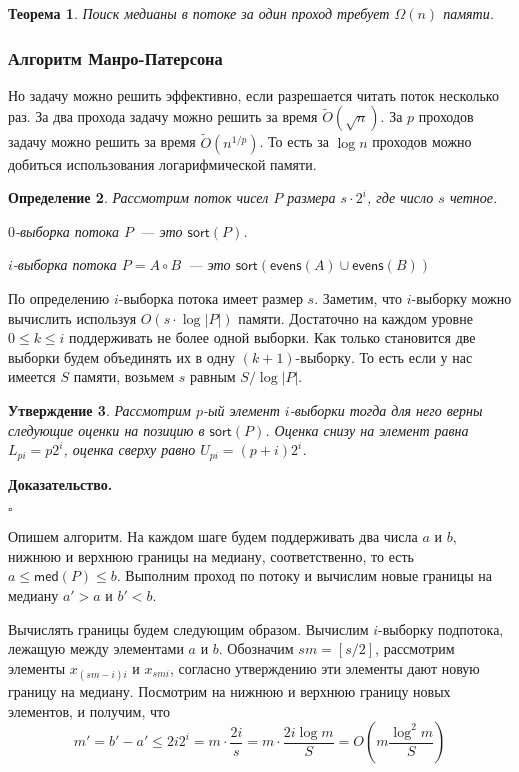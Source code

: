 \documentclass{article}
\newtheorem{theorem}{Теорема}
\newtheorem{definition}[theorem]{Определение}
\newtheorem{claim}[theorem]{Утверждение}
\newenvironment{proof}{\par\noindent%
{\bf Доказательство.\par\nopagebreak}}{\unskip\nobreak\enskip$\square$\par\bigskip}
\newcommand{\sort}{\mathsf{sort}}
\newcommand{\evens}{\mathsf{evens}}
\newcommand{\med}{\mathsf{med}}
\begin{document}
\begin{theorem}
    Поиск медианы в потоке за один проход требует $\Omega(n)$ памяти.
\end{theorem}

\subsubsection{Алгоритм Манро-Патерсона}

Но задачу можно решить эффективно, если разрешается читать поток несколько раз.
За два прохода задачу можно решить за время $\tilde{O}\left(\sqrt n\right)$.
За $p$ проходов задачу можно решить за время $\tilde{O}\left(n^{1 / p}\right)$.
То есть за $\log n$ проходов можно добиться использования логарифмической памяти.

\begin{definition}
    Рассмотрим поток чисел $P$ размера $s \cdot 2^i$, где число $s$ четное.

    $0$-выборка потока $P$~--- это $\sort(P)$.

    $i$-выборка потока $P = A \circ B$~--- это $\sort \left(\evens(A) \cup \evens(B) \right)$
\end{definition}

По определению $i$-выборка потока имеет размер $s$. Заметим, что $i$-выборку можно
вычислить используя $O\left(s \cdot \log |P| \right)$ памяти. Достаточно на каждом уровне
$0 \leq k \leq i$ поддерживать не более одной выборки.
Как только становится две выборки будем объединять их в одну $(k+1)$-выборку.
То есть если у нас имеется $S$ памяти, возьмем $s$ равным $S / \log |P|$.

\begin{claim}
    Рассмотрим $p$-ый элемент $i$-выборки тогда для него верны следующие оценки на 
    позицию в $\sort(P)$. Оценка снизу на элемент равна $L_{pi} = p 2^i$, оценка
    сверху равно $U_{pi} = (p + i) 2^i$.
\end{claim}

\begin{proof}
\end{proof}

Опишем алгоритм. На каждом шаге будем поддерживать два числа $a$ и $b$, нижнюю
и верхнюю границы на медиану, соответственно, то есть $a \leq \med(P) \leq b$.
Выполним проход по потоку и вычислим новые границы на медиану $a' > a$ и $b' < b$.

Вычислять границы будем следующим образом. Вычислим $i$-выборку подпотока, лежащую
между элементами $a$ и $b$. Обозначим $sm = [s / 2]$, рассмотрим элементы
$x_{(sm-i) i}$ и $x_{sm i}$, согласно утверждению эти элементы дают новую границу
на медиану. Посмотрим на нижнюю и верхнюю границу новых элементов, и получим, что
$$
m' = b' - a' \leq 2 i 2^i = m \cdot \frac{2i}{s} = m \cdot \frac{2i \log m}{S} 
    = O\left(m \frac{\log^2 m}{S} \right)
$$
\end{document}
